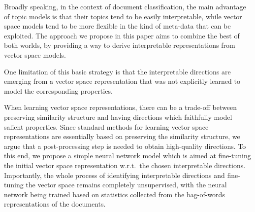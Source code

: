 Broadly speaking, in the context of document classification, the main advantage of topic models is that their topics tend to be easily interpretable, while vector space models tend to be more flexible in the kind of meta-data that can be exploited. The approach we propose in this paper aims to combine the best of both worlds, by providing a way to derive interpretable representations from vector space models.


One limitation of this basic strategy is that the interpretable directions are emerging from a vector space representation that was not explicitly learned to model the corresponding properties.

When learning vector space representations, there can be a trade-off between preserving similarity structure and having directions which faithfully model salient properties. Since standard methods for learning vector space representations are essentially based on preserving the similarity structure, we argue that a post-processing step is needed to obtain high-quality directions. To this end, we propose a simple neural network model which is aimed at fine-tuning the initial vector space representation w.r.t.\ the chosen interpretable directions. Importantly, the whole process of identifying interpretable directions and fine-tuning the vector space remains completely unsupervised, with the neural network being trained based on statistics collected from the bag-of-words representations of the documents. 


